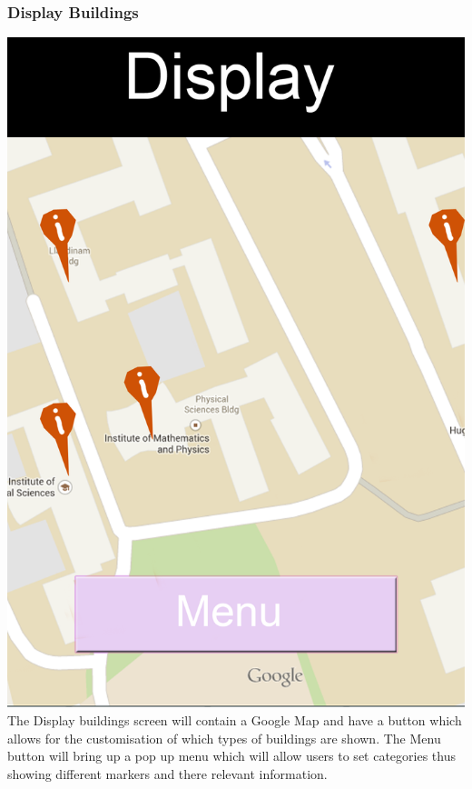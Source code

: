 \subsubsection{Display Buildings}
\includegraphics[scale=0.6]{Design/Display.png}\\
The Display buildings screen will contain a Google Map and have a button which allows for the customisation of which types of buildings are shown. The Menu button will bring up a pop up menu which will allow users to set categories thus showing different markers and there relevant information. 
